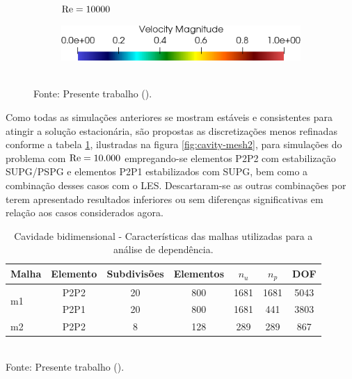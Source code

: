 \begin{figure}[h!]
\begin{subfigure}{0.32\textwidth}
        \caption{$\mathrm{Re}=10000$}
    \end{subfigure}
    \begin{subfigure}{0.4\textwidth}
        \includegraphics[width=\linewidth]{Figuras/Cavity/legenda.png}
    \end{subfigure}
    \\Fonte: Presente trabalho (\the\year).
    \label{fig:cavity-results2}
\end{figure}


Como todas as simulações anteriores se mostram estáveis e consistentes para atingir a solução estacionária, são propostas as discretizações menos refinadas conforme a tabela \ref{tab:cavity-mesh2}, ilustradas na figura \ref{fig:cavity-mesh2}, para simulações do problema com $\mathrm{Re}=10.000$ empregando-se elementos P2P2 com estabilização SUPG/PSPG e elementos P2P1 estabilizados com SUPG, bem como a combinação desses casos com o LES. Descartaram-se as outras combinações por terem apresentado resultados inferiores ou sem diferenças significativas em relação aos casos considerados agora.

\begin{table}[h!]
    \centering
    \caption{Cavidade bidimensional - Características das malhas utilizadas para a análise de dependência.}
    \begin{tabular}{lcccccc}
        \hline
        Malha               & Elemento & Subdivisões & Elementos & $n_u$ & $n_p$ & DOF  \\\hline
        \multirow{2}{*}{m1} & P2P2     & 20          & 800       & 1681  & 1681  & 5043 \\
                            & P2P1     & 20          & 800       & 1681  & 441   & 3803 \\\hline
        m2                  & P2P2     & 8           & 128       & 289   & 289   & 867  \\\hline
    \end{tabular}
    \\Fonte: Presente trabalho (\the\year).
    \label{tab:cavity-mesh2}
\end{table}

